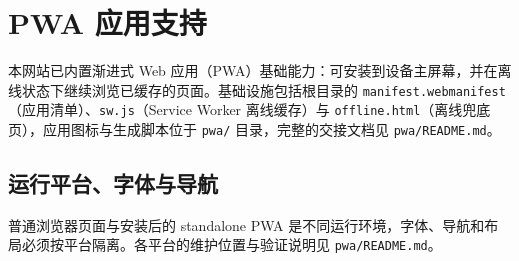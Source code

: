 \documentclass[fontset=fandol]{ctexrep}
\begin{document}
\section{PWA 应用支持}

本网站已内置渐进式 Web 应用（PWA）基础能力：可安装到设备主屏幕，并在离线状态下继续浏览已缓存的页面。基础设施包括根目录的 \verb|manifest.webmanifest|（应用清单）、\verb|sw.js|（Service Worker 离线缓存）与 \verb|offline.html|（离线兜底页），应用图标与生成脚本位于 \verb|pwa/| 目录，完整的交接文档见 \verb|pwa/README.md|。

\subsection{运行平台、字体与导航}

普通浏览器页面与安装后的 standalone PWA 是不同运行环境，字体、导航和布局必须按平台隔离。各平台的维护位置与验证说明见 \verb|pwa/README.md|。
\end{document}
